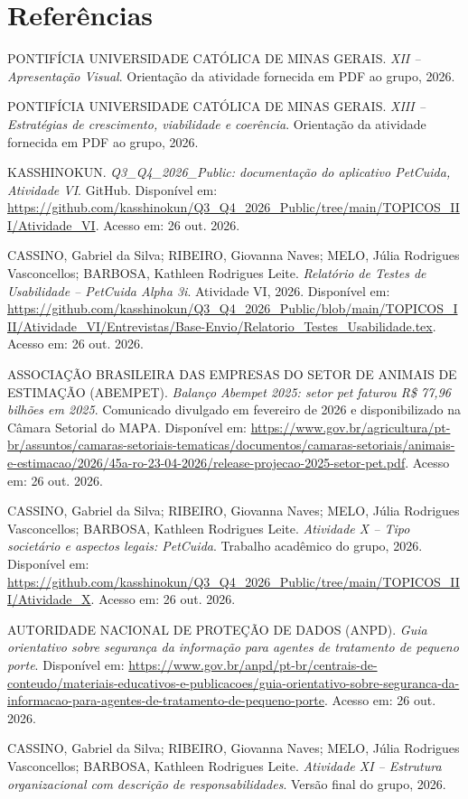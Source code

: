 \documentclass[12pt,a4paper]{article}
\begin{document}
\clearpage
\section*{Referências}
\small
\begin{enumerate}[label={[\arabic*]},leftmargin=1.3cm,itemsep=0.2em]
\item PONTIFÍCIA UNIVERSIDADE CATÓLICA DE MINAS GERAIS. \textit{XII -- Apresentação Visual}. Orientação da atividade fornecida em PDF ao grupo, 2026.
\item PONTIFÍCIA UNIVERSIDADE CATÓLICA DE MINAS GERAIS. \textit{XIII -- Estratégias de crescimento, viabilidade e coerência}. Orientação da atividade fornecida em PDF ao grupo, 2026.
\item KASSHINOKUN. \textit{Q3\_Q4\_2026\_Public: documentação do aplicativo PetCuida, Atividade VI}. GitHub. Disponível em: \url{https://github.com/kasshinokun/Q3_Q4_2026_Public/tree/main/TOPICOS_III/Atividade_VI}. Acesso em: 26 out. 2026.
\item CASSINO, Gabriel da Silva; RIBEIRO, Giovanna Naves; MELO, Júlia Rodrigues Vasconcellos; BARBOSA, Kathleen Rodrigues Leite. \textit{Relatório de Testes de Usabilidade -- PetCuida Alpha 3i}. Atividade VI, 2026. Disponível em: \url{https://github.com/kasshinokun/Q3_Q4_2026_Public/blob/main/TOPICOS_III/Atividade_VI/Entrevistas/Base-Envio/Relatorio_Testes_Usabilidade.tex}. Acesso em: 26 out. 2026.
\item ASSOCIAÇÃO BRASILEIRA DAS EMPRESAS DO SETOR DE ANIMAIS DE ESTIMAÇÃO (ABEMPET). \textit{Balanço Abempet 2025: setor pet faturou R\$ 77,96 bilhões em 2025}. Comunicado divulgado em fevereiro de 2026 e disponibilizado na Câmara Setorial do MAPA. Disponível em: \url{https://www.gov.br/agricultura/pt-br/assuntos/camaras-setoriais-tematicas/documentos/camaras-setoriais/animais-e-estimacao/2026/45a-ro-23-04-2026/release-projecao-2025-setor-pet.pdf}. Acesso em: 26 out. 2026.
\item CASSINO, Gabriel da Silva; RIBEIRO, Giovanna Naves; MELO, Júlia Rodrigues Vasconcellos; BARBOSA, Kathleen Rodrigues Leite. \textit{Atividade X -- Tipo societário e aspectos legais: PetCuida}. Trabalho acadêmico do grupo, 2026. Disponível em: \url{https://github.com/kasshinokun/Q3_Q4_2026_Public/tree/main/TOPICOS_III/Atividade_X}. Acesso em: 26 out. 2026.
\item AUTORIDADE NACIONAL DE PROTEÇÃO DE DADOS (ANPD). \textit{Guia orientativo sobre segurança da informação para agentes de tratamento de pequeno porte}. Disponível em: \url{https://www.gov.br/anpd/pt-br/centrais-de-conteudo/materiais-educativos-e-publicacoes/guia-orientativo-sobre-seguranca-da-informacao-para-agentes-de-tratamento-de-pequeno-porte}. Acesso em: 26 out. 2026.
\item CASSINO, Gabriel da Silva; RIBEIRO, Giovanna Naves; MELO, Júlia Rodrigues Vasconcellos; BARBOSA, Kathleen Rodrigues Leite. \textit{Atividade XI -- Estrutura organizacional com descrição de responsabilidades}. Versão final do grupo, 2026.
\end{enumerate}
\normalsize
\end{document}
